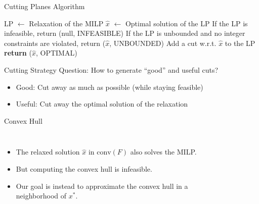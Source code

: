 \begin{frame}{Cutting Planes Algorithm}
     \begin{algorithmic}[1]
     \State LP $\gets$ Relaxation of the MILP
     \Repeat
    	\State $\hat{x}$ $\gets$ Optimal solution of the LP 
    	\State If the LP is infeasible, return (null, INFEASIBLE)
    	\State If the LP is unbounded and no integer constraints are violated,
    	\State return ($\hat{x}$, UNBOUNDED)
    		\State Add a cut w.r.t. $\hat{x}$ to the LP
    	\EndIf 
    \State \textbf{return} ($\hat{x}$, OPTIMAL)
   \end{algorithmic}
\end{frame}

\begin{frame}[c]{Cutting Strategy}
\centering\large
	Question: How to generate ``good'' and useful cuts?
	\begin{itemize}[<+(1)->]
	\item Good: Cut away as much as possible (while staying feasible)
	\item Useful: Cut away the optimal solution of the relaxation
	\end{itemize}
\end{frame}

\begin{frame}{Convex Hull}
\begin{columns}
\begin{itemize}
\item The relaxed solution $\hat{x}$ in $\text{conv}(F)$ also solves the MILP.
\item But computing the convex hull is infeasible.
\item Our goal is instead to approximate the convex hull in a neighborhood of $x^*$.
\end{itemize}

\begin{figure}[p]
        \centering
        
    \end{figure}
\end{columns}
\end{frame}

